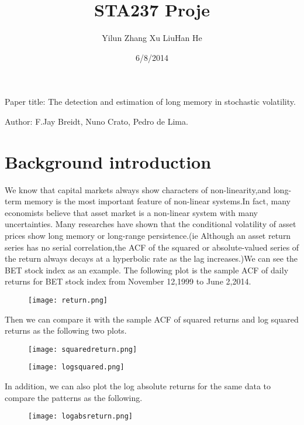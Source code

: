 \documentclass[10pt,a4paper]{article}
\title{\huge STA237 Proje}
\date{6/8/2014}
\author[1]{Yilun Zhang \qquad  Xu Liu\qquad Han He}
\begin{document}
\maketitle
\begin{center} Paper title: The detection and estimation of long memory in stochastic volatility.\end{center}

\begin{center} Author: F.Jay Breidt, Nuno Crato, Pedro de Lima.\end{center}

\section{Background introduction}

We know that capital markets always show characters of non-linearity,and long-term memory is the most important feature of non-linear systems.In fact, many economists believe that asset market is a non-linear system with many uncertainties. Many researches have shown that the conditional volatility of asset prices show long memory or long-range persistence.(ie Although an asset return series has no serial correlation,the ACF of the squared or absolute-valued series of the return always decays at a hyperbolic rate as the lag increases.)We can see the BET stock index as an example. The following plot is the sample ACF of daily returns for BET stock index from November 12,1999 to June 2,2014.

\begin{figure}
\centering
\texttt{[image: return.png]}
\caption{}
\end{figure}

Then we can compare it with the sample ACF of squared returns and log squared returns as the following two plots.

\begin{figure}
\centering
\texttt{[image: squaredreturn.png]}
\caption{}
\end{figure}
\begin{figure}
\centering
\texttt{[image: logsquared.png]}
\caption{}
\end{figure}



In addition, we can also plot the log absolute returns for the same data to compare the patterns as the following.

\begin{figure}
\centering
\texttt{[image: logabsreturn.png]}
\caption{}
\end{figure}
\end{document}
